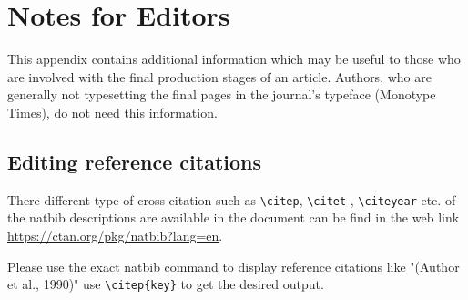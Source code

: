 \documentclass[lineno]{JFM-FLM_Au}
\begin{document}
\section{Notes for Editors}

This appendix contains additional information which may be useful to
those who are involved with the final production stages of an article.
Authors, who are generally not typesetting the final pages in the
journal's typeface (Monotype Times), do not need this information.


\subsection{Editing reference citations}

There different type of cross citation such as \verb"\citep",  \verb"\citet" , \verb"\citeyear"
etc. of the natbib descriptions are available in the document can be find in the web
link \url{https://ctan.org/pkg/natbib?lang=en}.

Please use the exact natbib command to display reference citations like \citep{Arntzenius2012} "(Author et al., 1990)" use \verb"\citep{key}" to get the desired output.






\end{document}

